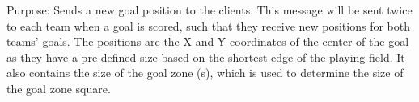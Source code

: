 Purpose: Sends a new goal position to the clients.
This message will be sent twice to each team when a goal is scored, such that they receive new positions for both teams' goals.
The positions are the X and Y coordinates of the center of the goal as they have a pre-defined size based on the shortest edge of the playing field.
It also contains the size of the goal zone (s), which is used to determine the size of the goal zone square.
